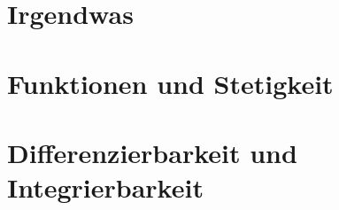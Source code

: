 \documentclass[consecutivenumbering, transparentEnvironments]{gadsescript}
\begin{document}
\maketitle

\tableofcontents
\newpage

\part{Irgendwas}






\part{Funktionen und Stetigkeit}






\part{Differenzierbarkeit und Integrierbarkeit}



\end{document}
